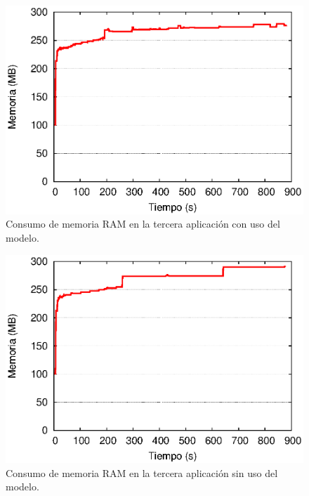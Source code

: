 \begin{figure}[!ht]
\centering
    \includegraphics[scale=0.75]{images/exp/app3/cm/fisical/consumeRAM.eps}
    \caption{Consumo de memoria RAM en la tercera aplicación con uso del modelo.}
    \label{fig:app3-consumeRAM-cm}
\end{figure}

\begin{figure}[!ht]
\centering
    \includegraphics[scale=0.75]{images/exp/app3/sm/fisical/consumeRAM.eps}
    \caption{Consumo de memoria RAM en la tercera aplicación sin uso del modelo.}
    \label{fig:app3-consumeRAM-sm}
\end{figure}


